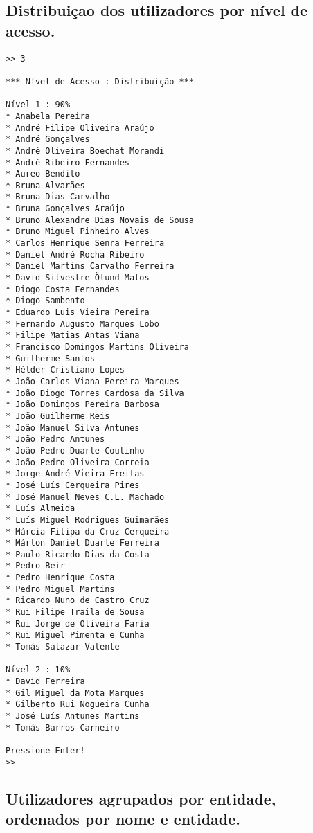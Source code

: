 \documentclass[11pt,a4paper]{report}%
\begin{document}
\subsection{Distribuiçao dos utilizadores por nível de acesso.}

\begin{verbatim}
>> 3

*** Nível de Acesso : Distribuição ***

Nível 1 : 90%
* Anabela Pereira
* André Filipe Oliveira Araújo
* André Gonçalves
* André Oliveira Boechat Morandi
* André Ribeiro Fernandes
* Aureo Bendito
* Bruna Alvarães
* Bruna Dias Carvalho
* Bruna Gonçalves Araújo
* Bruno Alexandre Dias Novais de Sousa
* Bruno Miguel Pinheiro Alves
* Carlos Henrique Senra Ferreira
* Daniel André Rocha Ribeiro
* Daniel Martins Carvalho Ferreira
* David Silvestre Ölund Matos
* Diogo Costa Fernandes
* Diogo Sambento
* Eduardo Luis Vieira Pereira
* Fernando Augusto Marques Lobo
* Filipe Matias Antas Viana
* Francisco Domingos Martins Oliveira
* Guilherme Santos
* Hélder Cristiano Lopes
* João Carlos Viana Pereira Marques
* João Diogo Torres Cardosa da Silva
* João Domingos Pereira Barbosa
* João Guilherme Reis
* João Manuel Silva Antunes
* João Pedro Antunes
* João Pedro Duarte Coutinho
* João Pedro Oliveira Correia
* Jorge André Vieira Freitas
* José Luís Cerqueira Pires
* José Manuel Neves C.L. Machado
* Luís Almeida
* Luís Miguel Rodrigues Guimarães
* Márcia Filipa da Cruz Cerqueira
* Márlon Daniel Duarte Ferreira
* Paulo Ricardo Dias da Costa
* Pedro Beir
* Pedro Henrique Costa
* Pedro Miguel Martins
* Ricardo Nuno de Castro Cruz
* Rui Filipe Traila de Sousa
* Rui Jorge de Oliveira Faria
* Rui Miguel Pimenta e Cunha
* Tomás Salazar Valente

Nível 2 : 10%
* David Ferreira
* Gil Miguel da Mota Marques
* Gilberto Rui Nogueira Cunha
* José Luís Antunes Martins
* Tomás Barros Carneiro

Pressione Enter!
>>  
\end{verbatim}


\subsection{Utilizadores agrupados por entidade, ordenados por nome e entidade.}
\end{document}
